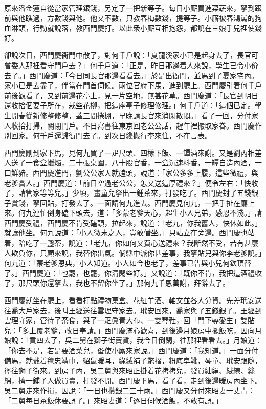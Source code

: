 原來潘金蓮自從當家管理銀錢，另定了一把新等子。每日小厮買進菜蔬來，拏到跟前與他瞧過，方數錢與他。{}他又不數，只教春梅數錢，提等子。小厮被春鴻罵的狗血淋頭，行動就說落，教西門慶打。以此衆小厮互相抱怨，都說在三娘手兒裡使錢好。

卻說次日，西門慶衙門中散了，對何千戶說：「夏龍溪家小已是起身去了，長官可曾委人那裡看守門戶去？」何千戶道：「正是，昨日那邊着人來說，學生已令小价去了。」西門慶道：「今日同長官那邊看看去。」於是出衙門，並馬到了夏家宅內。家小已是去盡了，伴當在門首伺候。兩位官府下馬，進到廳上。西門慶引着何千戶前後觀看了，又到前邊花亭上，見一片空地，無甚花草。西門慶道：「長官到明日還收拾個耍子所在，栽些花柳，把這座亭子修理修理。」何千戶道：「這個已定。學生開春從新修整修整，蓋三間捲棚，早晚請長官來消閑散悶。」看了一回，分付家人收拾打掃，關閉門戶。不日寫書往東京回老公公話，趕年裡搬取家眷。西門慶作別回家。何千戶還歸衙門去了。到次日纔搬行李來住，不在言表。

西門慶剛到家下馬，見何九買了一疋尺頭、四樣下飯、一罈酒來謝。又是劉內相差人送了一食盒蠟燭，二十張桌圍，八十股官香，一盒沉速料香，一罈自造內酒，一口鮮豬。西門慶進門，劉公公家人就磕頭，說道：「家公多多上履，這些微禮，與老爹賞人。」西門慶道：「前日空過老公公，怎又送這厚禮來？」便令左右：「快收了，請管家等等兒。」少頃，畫童兒拏出一鍾茶來，打發吃了。西門慶封了五錢銀子賞錢，拏回貼，打發去了。一面請何九進去。西門慶見何九，一把手扯在廳上來。何九連忙倒身磕下頭去，道：「多蒙老爹天心，超生小人兄弟，感恩不淺。」請西門慶受禮，西門慶不肯受磕頭，拉起來，說道：「老九，你我舊人，快休如此。」就讓他坐。何九說道：「小人微末之人，豈敢僭坐。」只站立在旁邊。西門慶也站着，陪吃了一盞茶，說道：「老九，你如何又費心送禮來？我斷然不受，若有甚麼人欺負你，只顧來說，我替你出氣。倘縣中派你甚差事，我拏貼兒與你李老爹說。」何九道：「蒙老爹恩典，小人知道。小人如今也老了，差事已告與小兒何欽頂替了。」西門慶道：「也罷，也罷，你清閑些好。」又說道：「既你不肯，我把這酒禮收了，那尺頭你還拏去，我也不留你坐了。」那何九千恩萬謝，拜辭去了。

西門慶就坐在廳上，看看打點禮物菓盒、花紅羊酒、軸文並各人分資。先差玳安送往喬大戶家去，後叫王經送往雲理守家去。玳安回來，喬家與了五錢銀子。王經到雲理守家，管待了茶食，與了一疋眞青大布、一雙琴鞋，回「門下辱愛生」雙貼兒：「多上覆老爹，改日奉請。」西門慶滿心歡喜，到後邊月娘房中擺飯吃，因向月娘說：「賁四去了，吳二舅在獅子街賣貨，我今日倒閑，往那裡看看去。」月娘道：「你去不是，若是要酒菜兒，蚤使小厮來家說。」西門慶道：「我知道。」一面分付備馬，就戴着氊忠靖巾，貂鼠暖耳，綠絨補子氅褶，粉底皁靴，琴童、玳安跟隨，徑往獅子街來。到房子內，吳二舅與來昭正掛着花拷拷兒，發買紬絹、絨線、絲綿，擠一鋪子人做買賣，打發不開。西門慶下馬，看了看，走到後邊暖房內坐下。吳二舅走來作揖，因說：「一日也攢銀二三十兩。」西門慶又分付來昭妻一丈青：「二舅每日茶飯休要誤了。」來昭妻道：「逐日伺候酒飯，不敢有誤。」

